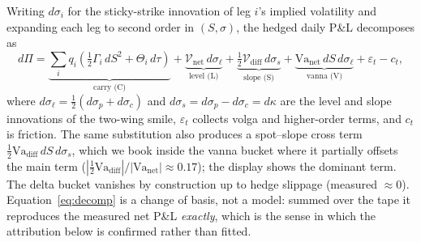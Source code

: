 \documentclass[11pt]{article}
\newcommand{\Va}{\mathrm{Va}}
\begin{document}
Writing $d\sigma_i$ for the sticky-strike innovation of leg $i$'s implied volatility and
expanding each leg to second order in $(S, \sigma)$, the hedged daily P\&L decomposes as
\begin{equation}
d\Pi = \underbrace{\textstyle\sum_i q_i(\tfrac12\Gamma_i\,dS^2 + \Theta_i\,d\tau)}_{\text{carry (C)}}
 + \underbrace{\mathcal V_{\mathrm{net}}\,d\sigma_\ell}_{\text{level (L)}}
 + \underbrace{\tfrac12 \mathcal V_{\mathrm{diff}}\,d\sigma_s}_{\text{slope (S)}}
 + \underbrace{\Va_{\mathrm{net}}\,dS\,d\sigma_\ell}_{\text{vanna (V)}}
 + \varepsilon_t - c_t,
\label{eq:decomp}
\end{equation}
where $d\sigma_\ell = \tfrac12(d\sigma_p + d\sigma_c)$ and $d\sigma_s = d\sigma_p - d\sigma_c
= d\kappa$ are the level and slope innovations of the two-wing smile, $\varepsilon_t$ collects
volga and higher-order terms, and $c_t$ is friction. The same substitution also produces a
spot--slope cross term $\tfrac12 \Va_{\mathrm{diff}}\, dS\, d\sigma_s$, which we book inside
the vanna bucket where it partially offsets the main term
($|\tfrac12\Va_{\mathrm{diff}}|/|\Va_{\mathrm{net}}| \approx 0.17$); the display shows the
dominant term. The delta bucket vanishes by
construction up to hedge slippage (measured $\approx 0$). Equation~\eqref{eq:decomp} is a
change of basis, not a model: summed over the tape it reproduces the measured net P\&L
\emph{exactly}, which is the sense in which the attribution below is confirmed rather than
fitted.
\end{document}
